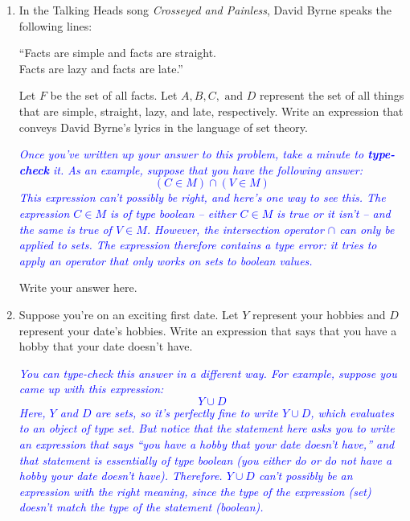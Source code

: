 \documentclass{article}
\renewcommand{\(}{\left(}
\renewcommand{\)}{\right)}
\theoremstyle{plain}
\theoremstyle{plain}
\theoremstyle{definition}
\begin{document}
\begin{enumerate}[label*=\roman*.,ref=\roman*]

\item In the Talking Heads song \textit{Crosseyed and Painless}, David Byrne speaks the following lines:
\begin{center}
``Facts are simple and facts are straight. \\
Facts are lazy and facts are late.''
\end{center}
Let $F$ be the set of all facts. Let $A, B, C,\text{ and }D$ represent the set of all things that are simple, straight, lazy, and late, respectively. Write an expression that conveys David Byrne's lyrics in the language of set theory.

\textit{\textcolor{blue}{Once you've written up your answer to this problem, take a minute to \textbf{type-check} it. As an example, suppose
that you have the following answer: 
\begin{equation*}
(C \in M) \cap (V \in M)
\end{equation*}
This expression can't possibly be right, and here's one way to see this. The expression $C \in M$ is of type
boolean -- either $C \in M$ is true or it isn't -- and the same is true of $V \in M$. However, the intersection operator
$\cap$ can only be applied to sets. The expression therefore contains a type error: it tries to apply an operator that only works on sets to boolean values. }}

\begin{shaded}
Write your answer here.
\end{shaded}

\item Suppose you're on an exciting first date. Let $Y$ represent your hobbies and $D$ represent your
date's hobbies. Write an expression that says that you have a hobby that your date doesn't have.

\textit{\textcolor{blue}{You can type-check this answer in a different way. For example, suppose you came up with this expression:
\begin{equation*}
Y \cup D
\end{equation*}
Here, $Y$ and $D$ are sets, so it's perfectly fine to write $Y \cup D$, which evaluates to an object of type set. But
notice that the statement here asks you to write an expression that says ``you have a hobby that your date
doesn't have,'' and that statement is essentially of type boolean (you either do or do not have a hobby your
date doesn't have). Therefore. $Y \cup D$ can't possibly be an expression with the right meaning, since the type
of the expression (set) doesn't match the type of the statement (boolean). }}


\end{enumerate}
\end{document}
